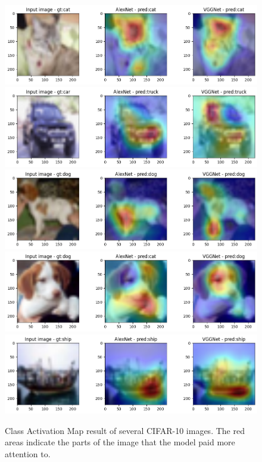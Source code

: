 \documentclass[extendedabs]{bmvc2k}
\begin{document}
\begin{figure}[t]
\centering
	\includegraphics[width=\linewidth]{images/camresult1.png}
    \includegraphics[width=\linewidth]{images/camresult2.png}
    \includegraphics[width=\linewidth]{images/camresult3.png}
    \includegraphics[width=\linewidth]{images/camresult4.png}
    \includegraphics[width=\linewidth]{images/camresult5.png}
	\caption{
		Class Activation Map result of several CIFAR-10 images. The red areas indicate the parts of the image that the model paid more attention to.}
	\vspace{-2mm}
        \label{fig:camresult}
\end{figure}
\end{document}

